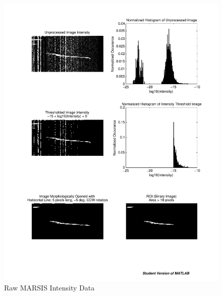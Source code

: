 \begin{figure}
	\begin{minipage}[b]{0.5\linewidth} %
		\centering %
		\includegraphics[trim=65 580 320 75,clip,width=1\linewidth]{gfx/SimpleThres}
		\caption{Raw MARSIS Intensity Data}\label{fig:rawImg}
	\end{minipage}
	\begin{minipage}[b]{0.5\linewidth}
		\centering

\end{minipage}
\end{figure}
